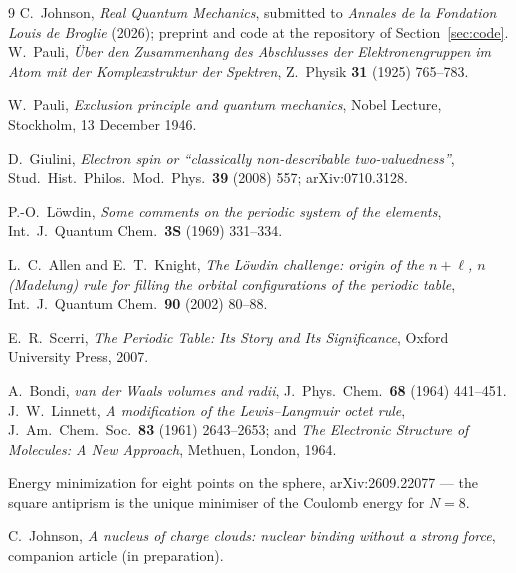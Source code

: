 \documentclass[11pt]{article}
\begin{document}
\begin{thebibliography}{9}
 C.~Johnson, \emph{Real Quantum Mechanics}, submitted to
\emph{Annales de la Fondation Louis de Broglie} (2026); preprint and code at the
repository of Section~\ref{sec:code}.
 W.~Pauli, \emph{\"Uber den Zusammenhang des Abschlusses der
  Elektronengruppen im Atom mit der Komplexstruktur der Spektren}, Z.~Physik \textbf{31} (1925)
  765--783.

 W.~Pauli, \emph{Exclusion principle and quantum mechanics}, Nobel Lecture,
  Stockholm, 13 December 1946.

 D.~Giulini, \emph{Electron spin or ``classically non-describable
  two-valuedness''}, Stud.\ Hist.\ Philos.\ Mod.\ Phys.\ \textbf{39} (2008) 557;
  arXiv:0710.3128.

 P.-O.~L\"owdin, \emph{Some comments on the periodic system of the
  elements}, Int.\ J.\ Quantum Chem.\ \textbf{3S} (1969) 331--334.

 L.~C.~Allen and E.~T.~Knight, \emph{The L\"owdin challenge: origin of
  the $n+\ell$, $n$ (Madelung) rule for filling the orbital configurations of the periodic
  table}, Int.\ J.\ Quantum Chem.\ \textbf{90} (2002) 80--88.

 E.~R.~Scerri, \emph{The Periodic Table: Its Story and Its Significance},
  Oxford University Press, 2007.

 A.~Bondi, \emph{van der Waals volumes and radii}, J.\ Phys.\ Chem.\
  \textbf{68} (1964) 441--451.
 J.~W.~Linnett, \emph{A modification of the Lewis--Langmuir octet
  rule}, J.~Am.~Chem.~Soc.\ \textbf{83} (1961) 2643--2653; and \emph{The Electronic Structure of
  Molecules: A New Approach}, Methuen, London, 1964.

 Energy minimization for eight points on the sphere, arXiv:2609.22077 --- the
  square antiprism is the unique minimiser of the Coulomb energy for $N=8$.

 C.~Johnson, \emph{A nucleus of charge clouds: nuclear
  binding without a strong force}, companion article (in preparation).


\end{thebibliography}
\end{document}
